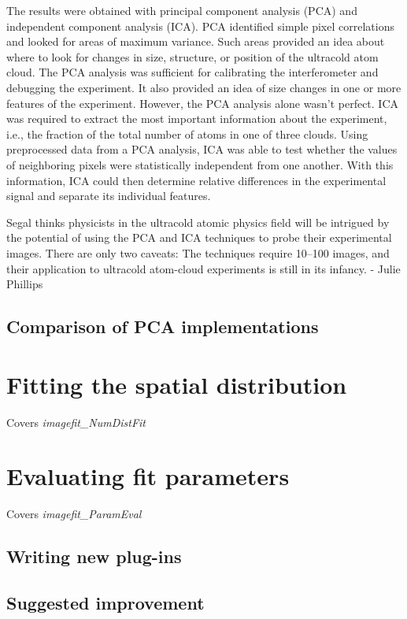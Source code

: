 The results were obtained with principal component analysis (PCA) and independent component analysis (ICA). PCA identified simple pixel correlations and looked for areas of maximum variance. Such areas provided an idea about where to look for changes in size, structure, or position of the ultracold atom cloud. The PCA analysis was sufficient for calibrating the interferometer and debugging the experiment. It also provided an idea of size changes in one or more features of the experiment. However, the PCA analysis alone wasn’t perfect. ICA was required to extract the most important information about the experiment, i.e., the fraction of the total number of atoms in one of three clouds. Using preprocessed data from a PCA analysis, ICA was able to test whether the values of neighboring pixels were statistically independent from one another. With this information, ICA could then determine relative differences in the experimental signal and separate its individual features.

Segal thinks physicists in the ultracold atomic physics field will be intrigued by the potential of using the PCA and ICA techniques to probe their experimental images. There are only two caveats: The techniques require 10–100 images, and their application to ultracold atom-cloud experiments is still in its infancy.   - Julie Phillips

\subsection{Comparison of PCA implementations}

\section{Fitting the spatial distribution}

Covers \emph{imagefit\_NumDistFit}

\section{Evaluating fit parameters}

Covers \emph{imagefit\_ParamEval}

\subsection{Writing new plug-ins}

\subsection{Suggested improvement}

